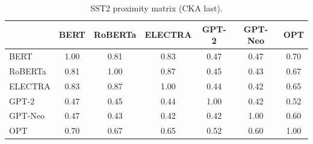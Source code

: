 \begin{table}[!ht]
\centering
\scriptsize
\setlength{\tabcolsep}{3pt}
\begin{tabular}{lcccccc}
\toprule
& \textbf{BERT} & \textbf{RoBERTa} & \textbf{ELECTRA} & \textbf{GPT-2} & \textbf{GPT-Neo} & \textbf{OPT} \\
\midrule
BERT & 1.00 & 0.81 & 0.83 & 0.47 & 0.47 & 0.70 \\
RoBERTa & 0.81 & 1.00 & 0.87 & 0.45 & 0.43 & 0.67 \\
ELECTRA & 0.83 & 0.87 & 1.00 & 0.44 & 0.42 & 0.65 \\
GPT-2 & 0.47 & 0.45 & 0.44 & 1.00 & 0.42 & 0.52 \\
GPT-Neo & 0.47 & 0.43 & 0.42 & 0.42 & 1.00 & 0.60 \\
OPT & 0.70 & 0.67 & 0.65 & 0.52 & 0.60 & 1.00 \\
\bottomrule
\end{tabular}
\caption{SST2 proximity matrix (CKA last).}
\label{tab:proximity_sst2}
\end{table}